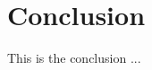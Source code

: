 \chapter{Conclusion}

\label{Chapter9_conclusion} 

\begin{comment}
-------------------------------------------------
9. Conclusion
-------------------------------------------------
\end{comment}


This is the conclusion ...


